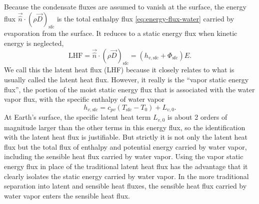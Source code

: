\documentclass{report}
\begin{document}
Because the condensate fluxes are assumed to vanish at the surface, the energy flux $\vec{\hat n} \cdot (\rho \vec{D})_{\mathrm{sfc}}$ is the total enthalpy flux \eqref{eq:energy-flux-water} carried by evaporation from the surface. It reduces to a static energy flux when kinetic energy is neglected,
\begin{equation}\label{e:sfc_LHF}
     \mathrm{LHF} = \vec{\hat n} \cdot (\rho \vec{D})_{\mathrm{sfc}}   = (h_{v, \mathrm{sfc}} + \Phi_\mathrm{sfc}) E.
\end{equation}
We call this the latent heat flux (LHF) because it closely relates to what is usually called the latent heat flux. However, it really is the ``vapor static energy flux'', the portion of the moist static energy flux that is associated with the water vapor flux, with the specific enthalpy of water vapor
\[
h_{v, \mathrm{sfc}} = c_{pv} (T_\mathrm{sfc}-T_0) + L_{v,0}.
\]
At Earth's surface, the specific latent heat term $L_{v,0}$ is about 2 orders of magnitude larger than the other terms in this energy flux, so the identification with the latent heat flux is justifiable. But strictly it is not only the latent heat flux but the total flux of enthalpy and potential energy carried by water vapor, including the sensible heat flux carried by water vapor. Using the vapor static energy flux in place of the traditional latent heat flux has the advantage that it clearly isolates the static energy carried by water vapor. In the more traditional separation into latent and sensible heat fluxes, the sensible heat flux carried by water vapor enters the sensible heat flux.
\end{document}
